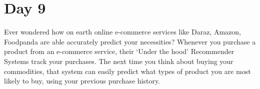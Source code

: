 \documentclass[11pt]{article}
\begin{document}
\section{Day 9}
Ever wondered how on earth online e-commerce services like Daraz, Amazon, Foodpanda are able accurately predict your necessities? Whenever you purchase a product from an e-commerce service, their `Under the hood' Recommender Systems track your purchases. The next time you think about buying your commodities, that system can easily predict what types of product you are most likely to buy, using your previous purchase history.
\end{document}

